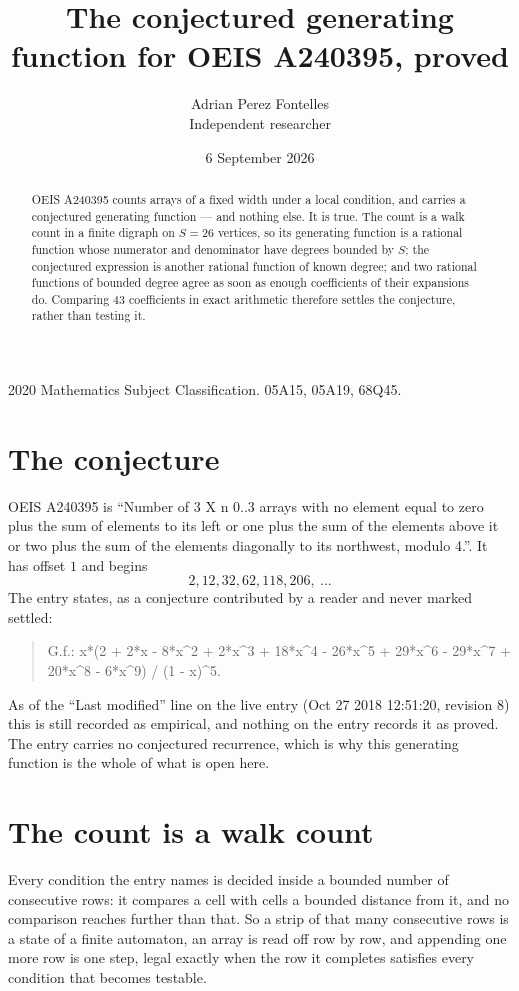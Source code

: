 \documentclass[11pt,a4paper]{article}
\title{The conjectured generating function for OEIS A240395, proved}
\author{Adrian Perez Fontelles\\ \small Independent researcher}
\date{6 September 2026}
\theoremstyle{plain}
\theoremstyle{definition}
\begin{document}
\maketitle

\begin{abstract}
OEIS A240395 counts arrays of a fixed width under a local condition, and carries a conjectured
generating function --- and nothing else. It is true. The count is a walk count in a finite
digraph on $S=26$ vertices, so its generating function is a rational function whose numerator
and denominator have degrees bounded by $S$; the conjectured expression is another rational
function of known degree; and two rational functions of bounded degree agree as soon as enough
coefficients of their expansions do. Comparing $43$ coefficients in exact arithmetic
therefore settles the conjecture, rather than testing it.
\end{abstract}

\noindent\small 2020 Mathematics Subject Classification. 05A15, 05A19, 68Q45.\normalsize

\section{The conjecture}

OEIS A240395 is ``Number of 3 X n 0..3 arrays with no element equal to zero plus the sum of elements to its left or one plus the sum of the elements above it or two plus the sum of the elements diagonally to its northwest, modulo 4.''. It has offset $1$ and begins
\[
2, 12, 32, 62, 118, 206,\ \dots
\]
The entry states, as a conjecture contributed by a reader and never marked settled:
\begin{quote}
G.f.: x*(2 + 2*x - 8*x\^{}2 + 2*x\^{}3 + 18*x\^{}4 - 26*x\^{}5 + 29*x\^{}6 - 29*x\^{}7 + 20*x\^{}8 - 6*x\^{}9) / (1 - x)\^{}5.
\end{quote}
As of the ``Last modified'' line on the live entry (Oct 27 2018 12:51:20, revision 8) this is still
recorded as empirical, and nothing on the entry records it as proved. The entry carries no
conjectured recurrence, which is why this generating function is the whole of what is open
here.

\section{The count is a walk count}

Every condition the entry names is decided inside a bounded number of consecutive rows: it
compares a cell with cells a bounded distance from it, and no comparison reaches further than
that. So a strip of that many consecutive rows is a state of a finite automaton, an array is
read off row by row, and appending one more row is one step, legal exactly when the row it
completes satisfies every condition that becomes testable.
\end{document}
